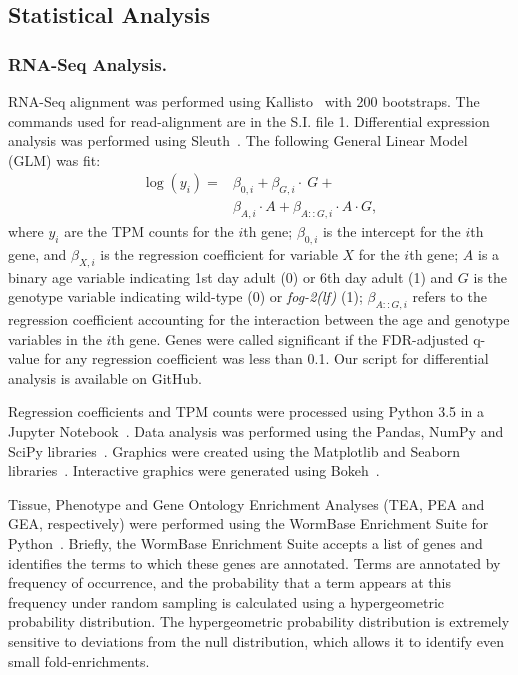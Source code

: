 \documentclass[9pt,twocolumn,twoside]{gsag3jnl}
\newcommand{\fog}{\emph{\mbox{fog-2(lf)}}}
\begin{document}
\subsection*{Statistical Analysis}
\label{sb:statistics}

\subsubsection*{RNA-Seq Analysis.}
RNA-Seq alignment was performed using Kallisto~\citep{Bray2016} with 200
bootstraps. The commands used for read-alignment are in the S.I. file 1.
Differential expression analysis was performed using Sleuth~\citep{Pimentel2016}.
The following General Linear Model (GLM) was fit:
\begin{align*}
  \log(y_i) =& \beta_{0,i} + \beta_{G,i}\cdot~G + \\
  &\beta_{A,i}\cdot A + \beta_{A::G,i}\cdot A\cdot G,
  \label{eqn:GLM}
\end{align*}
where $y_i$ are the TPM counts for the $i$th gene; $\beta_{0,i}$ is the intercept
for the $i$th gene, and $\beta_{X,i}$ is the regression coefficient for variable
$X$ for the $i$th gene; $A$ is a binary age variable indicating 1st day adult
(0) or 6th day adult (1) and $G$ is the genotype variable indicating wild-type
(0) or \fog{} (1); $\beta_{A::G, i}$ refers to the regression coefficient
accounting for the interaction between the age and genotype variables in the
$i$th gene. Genes were called significant if the FDR-adjusted q-value for any
regression coefficient was less than 0.1. Our script for differential analysis
is available on GitHub.

Regression coefficients and TPM counts were processed using Python 3.5 in a
Jupyter Notebook~\citep{Perez2007}. Data analysis was performed using the Pandas,
NumPy and SciPy libraries~\citep{McKinney2011,VanDerWalt2011,Oliphant2007}.
Graphics were created using the Matplotlib and Seaborn
libraries~\citep{Waskom,Hunter2007}. Interactive graphics were generated using
Bokeh~\citep{Team2014}.

Tissue, Phenotype and Gene Ontology Enrichment
Analyses (TEA, PEA and GEA, respectively) were performed using the WormBase
Enrichment Suite for Python~\citep{Angeles-Albores2016,Angeles-Albores106369}.
Briefly, the WormBase Enrichment Suite accepts a list of genes and identifies
the terms to which these genes are annotated. Terms are annotated by frequency
of occurrence, and the probability that a term appears at this frequency under
random sampling is calculated using a hypergeometric probability distribution.
The hypergeometric probability distribution is extremely sensitive to deviations
from the null distribution, which allows it to identify even small
fold-enrichments.
\end{document}
